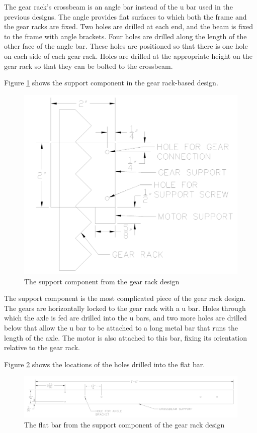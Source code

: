 \documentclass[11pt]{article}
\begin{document}
The gear rack’s crossbeam is an angle bar instead of the u bar used in the previous designs.
The angle provides flat surfaces to which both the frame and the gear racks are fixed.
Two holes are drilled at each end, and the beam is fixed to the frame with angle brackets.
Four holes are drilled along the length of the other face of the angle bar.
These holes are positioned so that there is one hole on each side of each gear rack.
Holes are drilled at the appropriate height on the gear rack so that they can be bolted to the crossbeam.

Figure \ref{fig:gear rack support} shows the support component in the gear rack-based design.

\begin{figure}[H]
  \centering
  \includegraphics[width=0.4\linewidth]{res/gear_rack_support.png}
  \caption{The support component from the gear rack design}
  \label{fig:gear rack support}
\end{figure}

The support component is the most complicated piece of the gear rack design.
The gears are horizontally locked to the gear rack with a u bar.
Holes through which the axle is fed are drilled into the u bars, and two more holes are drilled below that allow the u bar to be attached to a long metal bar that runs the length of the axle.
The motor is also attached to this bar, fixing its orientation relative to the gear rack.

Figure \ref{fig:gear rack support flat bar} shows the locations of the holes drilled into the flat bar.

\begin{figure}[H]
  \centering
  \includegraphics[width=\linewidth]{res/gear_rack_support_flat_bar.png}
  \caption{The flat bar from the support component of the gear rack design}
  \label{fig:gear rack support flat bar}
\end{figure}
\end{document}
